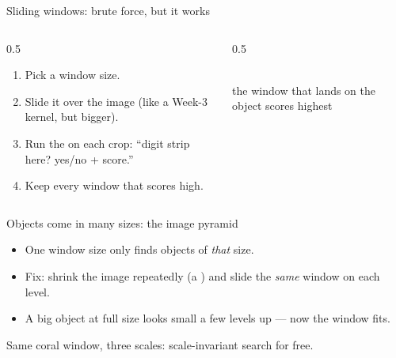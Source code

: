 \documentclass[10pt,aspectratio=169]{beamer}
\begin{document}
\begin{frame}{Sliding windows: brute force, but it works}
  \begin{columns}[T]
    \begin{column}{0.5\textwidth}
      \begin{enumerate}
        \item Pick a window size.
        \item Slide it over the image (like a Week-3 kernel, but bigger).
        \item Run the  on each crop: ``digit strip here? yes/no + score.''
        \item Keep every window that scores high.
      \end{enumerate}
    \end{column}
    \begin{column}{0.5\textwidth}
      \begin{center}
      \\[2pt]
      the window that lands on the object scores highest
      \end{center}
    \end{column}
  \end{columns}
\end{frame}

\begin{frame}{Objects come in many sizes: the image pyramid}
  \begin{itemize}
    \item One window size only finds objects of \emph{that} size.
    \item Fix: shrink the image repeatedly (a ) and slide the \emph{same} window on each level.
    \item A big object at full size looks small a few levels up --- now the window fits.
  \end{itemize}
  \begin{center}
  \end{center}
  Same coral window, three scales: scale-invariant search for free.
\end{frame}
\end{document}
